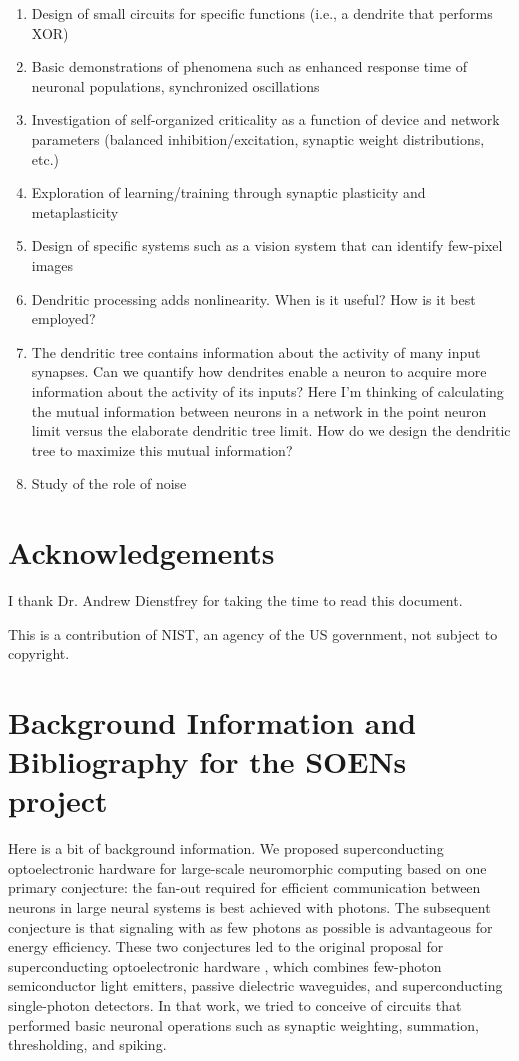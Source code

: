 \documentclass[]{article}
\begin{document}
\begin{enumerate}
\item Design of small circuits for specific functions (i.e., a dendrite that performs XOR)
\item Basic demonstrations of phenomena such as enhanced response time of neuronal populations, synchronized oscillations
\item Investigation of self-organized criticality as a function of device and network parameters (balanced inhibition/excitation, synaptic weight distributions, etc.)
\item Exploration of learning/training through synaptic plasticity and metaplasticity
\item Design of specific systems such as a vision system that can identify few-pixel images
\item Dendritic processing adds nonlinearity. When is it useful? How is it best employed?
\item The dendritic tree contains information about the activity of many input synapses. Can we quantify how dendrites enable a neuron to acquire more information about the activity of its inputs? Here I'm thinking of calculating the mutual information between neurons in a network in the point neuron limit versus the elaborate dendritic tree limit. How do we design the dendritic tree to maximize this mutual information?
\item Study of the role of noise
\end{enumerate}

\section{Acknowledgements}
I thank Dr. Andrew Dienstfrey for taking the time to read this document.

\vspace{0.5em}
\noindent This is a contribution of NIST, an agency of the US government, not subject to copyright.
	
\appendix

\section{\label{apx:background}Background Information and Bibliography for the SOENs project}
Here is a bit of background information. We proposed superconducting optoelectronic hardware for large-scale neuromorphic computing based on one primary conjecture: the fan-out required for efficient communication between neurons in large neural systems is best achieved with photons. The subsequent conjecture is that signaling with as few photons as possible is advantageous for energy efficiency. These two conjectures led to the original proposal for superconducting optoelectronic hardware \cite{shbu2017}, which combines few-photon semiconductor light emitters, passive dielectric waveguides, and superconducting single-photon detectors. In that work, we tried to conceive of circuits that performed basic neuronal operations such as synaptic weighting, summation, thresholding, and spiking. 
\end{document}
